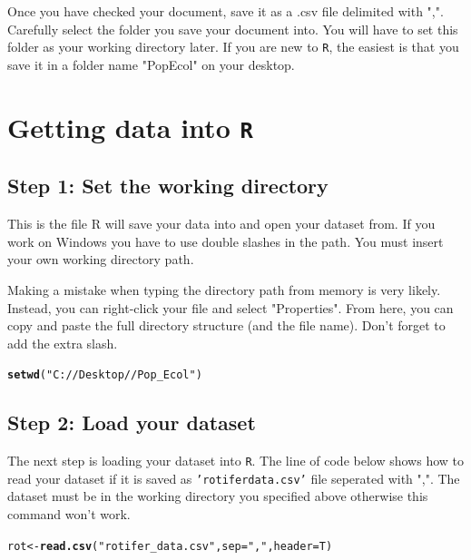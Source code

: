 \documentclass{article}\usepackage[]{graphicx}\usepackage[]{color}
\makeatletter
\newcommand{\hlstr}[1]{\textcolor[rgb]{0.192,0.494,0.8}{#1}}%
\newcommand{\hlstd}[1]{\textcolor[rgb]{0.345,0.345,0.345}{#1}}%
\newcommand{\hlkwb}[1]{\textcolor[rgb]{0.69,0.353,0.396}{#1}}%
\newcommand{\hlkwc}[1]{\textcolor[rgb]{0.333,0.667,0.333}{#1}}%
\newcommand{\hlkwd}[1]{\textcolor[rgb]{0.737,0.353,0.396}{\textbf{#1}}}%
\newenvironment{kframe}{%
 \def\at@end@of@kframe{}%
 \ifinner\ifhmode%
  \def\at@end@of@kframe{\end{minipage}}%
  \begin{minipage}{\columnwidth}%
 \fi\fi%
 \def\FrameCommand##1{\hskip\@totalleftmargin \hskip-\fboxsep
 \colorbox{shadecolor}{##1}\hskip-\fboxsep
     \hskip-\linewidth \hskip-\@totalleftmargin \hskip\columnwidth}%
 \MakeFramed {\advance\hsize-\width
   \@totalleftmargin\z@ \linewidth\hsize
   \@setminipage}}%
 {\par\unskip\endMakeFramed%
 \at@end@of@kframe}
\newenvironment{knitrout}{}{} %
\makeatother
\begin{document}
Once you have checked your document, save it as a .csv file delimited with ",". Carefully select the folder you save your document into. You will have to set this folder as your working directory later. If you are new to \texttt{R}, the easiest is that you save it in a folder name "Pop\textunderscore Ecol" on your desktop.

\section{Getting data into \texttt{R}}
\subsection{Step 1: Set the working directory}
This is the file R will save your data into and open your dataset from. If you work on Windows you have to use double slashes in the path. You must insert your own working directory path.

Making a mistake when typing the directory path from memory is very likely. Instead, you can right-click your file and select "Properties". From here, you can copy and paste the full directory structure (and the file name). Don't forget to add the extra slash.
\begin{knitrout}
\color{fgcolor}\begin{kframe}
\begin{alltt}
\hlkwd{setwd}\hlstd{(}\hlstr{"C://Desktop//Pop_Ecol"}\hlstd{)}
\end{alltt}
\end{kframe}
\end{knitrout}
\subsection{Step 2: Load your dataset}
The next step is loading your dataset into \texttt{R}. The line of code below shows how to read your dataset if it is saved as \texttt{'rotifer\textunderscore data.csv'} file seperated with ",". The dataset must be in the working directory you specified above otherwise this command won't work.
\begin{knitrout}
\color{fgcolor}\begin{kframe}
\begin{alltt}
\hlstd{rot}\hlkwb{<-}\hlkwd{read.csv}\hlstd{(}\hlstr{"rotifer_data.csv"}\hlstd{,} \hlkwc{sep}\hlstd{=}\hlstr{","}\hlstd{,} \hlkwc{header}\hlstd{=T)}
\end{alltt}
\end{kframe}
\end{knitrout}
\end{document}
